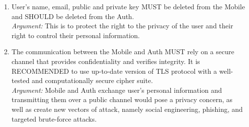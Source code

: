 \begin{enumerate}
                \item User's name, email, public and private key MUST be deleted from the Mobile and SHOULD be deleted
                      from the Auth.\\        
                \textit{Argument:} This is to protect the right to the privacy of the user and their right to control 
                                   their personal information.
    
                \item The communication between the Mobile and Auth MUST rely on a secure channel that provides 
                      confidentiality and verifies integrity. It is RECOMMENDED to use up-to-date version of 
                      TLS protocol with a well-tested and computationally secure cipher suite.\\      
                \textit{Argument:} Mobile and Auth exchange user's personal information and transmitting them over a 
                                   public channel would pose a privacy concern, as well as create new vectors of attack, 
                                   namely social engineering, phishing, and targeted brute-force attacks.
        \end{enumerate}
